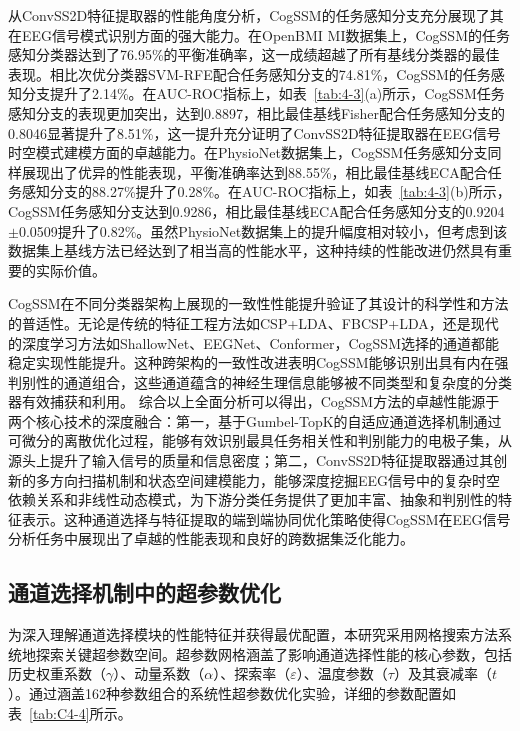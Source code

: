 从ConvSS2D特征提取器的性能角度分析，CogSSM的任务感知分支充分展现了其在EEG信号模式识别方面的强大能力。在OpenBMI MI数据集上，CogSSM的任务感知分类器达到了76.95\%的平衡准确率，这一成绩超越了所有基线分类器的最佳表现。相比次优分类器SVM-RFE配合任务感知分支的74.81\%，CogSSM的任务感知分支提升了2.14\%。在AUC-ROC指标上，如表~\ref{tab:4-3}(a)所示，CogSSM任务感知分支的表现更加突出，达到0.8897，相比最佳基线Fisher配合任务感知分支的0.8046显著提升了8.51\%，这一提升充分证明了ConvSS2D特征提取器在EEG信号时空模式建模方面的卓越能力。在PhysioNet数据集上，CogSSM任务感知分支同样展现出了优异的性能表现，平衡准确率达到88.55\%，相比最佳基线ECA配合任务感知分支的88.27\%提升了0.28\%。在AUC-ROC指标上，如表~\ref{tab:4-3}(b)所示，CogSSM任务感知分支达到0.9286，相比最佳基线ECA配合任务感知分支的0.9204$\pm$0.0509提升了0.82\%。虽然PhysioNet数据集上的提升幅度相对较小，但考虑到该数据集上基线方法已经达到了相当高的性能水平，这种持续的性能改进仍然具有重要的实际价值。


CogSSM在不同分类器架构上展现的一致性性能提升验证了其设计的科学性和方法的普适性。无论是传统的特征工程方法如CSP+LDA、FBCSP+LDA，还是现代的深度学习方法如ShallowNet、EEGNet、Conformer，CogSSM选择的通道都能稳定实现性能提升。这种跨架构的一致性改进表明CogSSM能够识别出具有内在强判别性的通道组合，这些通道蕴含的神经生理信息能够被不同类型和复杂度的分类器有效捕获和利用。
综合以上全面分析可以得出，CogSSM方法的卓越性能源于两个核心技术的深度融合：第一，基于Gumbel-TopK的自适应通道选择机制通过可微分的离散优化过程，能够有效识别最具任务相关性和判别能力的电极子集，从源头上提升了输入信号的质量和信息密度；第二，ConvSS2D特征提取器通过其创新的多方向扫描机制和状态空间建模能力，能够深度挖掘EEG信号中的复杂时空依赖关系和非线性动态模式，为下游分类任务提供了更加丰富、抽象和判别性的特征表示。这种通道选择与特征提取的端到端协同优化策略使得CogSSM在EEG信号分析任务中展现出了卓越的性能表现和良好的跨数据集泛化能力。


\subsection{通道选择机制中的超参数优化}
\label{subsec:hyperparameter_optimization}

为深入理解通道选择模块的性能特征并获得最优配置，本研究采用网格搜索方法系统地探索关键超参数空间。超参数网格涵盖了影响通道选择性能的核心参数，包括历史权重系数（$\gamma$）、动量系数（$\alpha$）、探索率（$\varepsilon$）、温度参数（$\tau$）及其衰减率（$t$）。通过涵盖162种参数组合的系统性超参数优化实验，详细的参数配置如表~\ref{tab:C4-4}所示。



